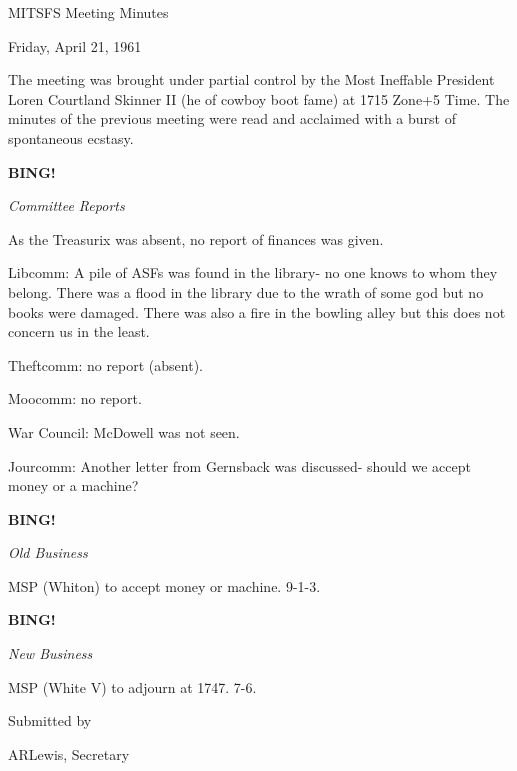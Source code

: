\documentclass[12pt]{article}
\newcommand{\bing}{{\bf BING!} }
\newcommand{\goto}[1]{\bing \vskip 12pt \centerline{{\em{#1}}}}
\begin{document}
\begin{center}

MITSFS Meeting Minutes

Friday, April 21, 1961

\end{center}
 
\vspace{12pt}

\setlength{\parskip}{6pt}

\noindent
The meeting was brought under partial control by the Most Ineffable President Loren Courtland Skinner II (he of cowboy boot fame) at 1715 Zone+5 Time. The minutes of the previous meeting were read and acclaimed with a burst of spontaneous ecstasy.

\goto{Committee Reports}

As the Treasurix was absent, no report of finances was given.

Libcomm: A pile of ASFs was found in the library- no one knows to whom they belong. There was a flood in the library due to the wrath of some god but no books were damaged. There was also a fire in the bowling alley but this does not concern us in the least.

Theftcomm: no report (absent).

Moocomm: no report.

War Council: McDowell was not seen.

Jourcomm: Another letter from Gernsback was discussed- should we accept money or a machine?

\goto{Old Business}

MSP (Whiton) to accept money or machine. 9-1-3.

\goto{New Business}

MSP (White V) to adjourn at 1747. 7-6.

\vspace{12pt}

\centerline{Submitted by}
\centerline{ARLewis, Secretary}
\end{document}
